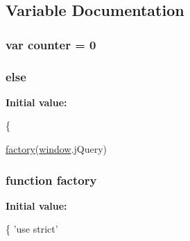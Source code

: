 \subsection{Variable Documentation}
\hypertarget{jquery_8iframe-transport_8js_ae2ecbfe6e878f64156d90e6f31875f2c}{
\subsubsection[{counter}]{\setlength{\rightskip}{0pt plus 5cm}var counter = 0}}\label{jquery_8iframe-transport_8js_ae2ecbfe6e878f64156d90e6f31875f2c}
\hypertarget{jquery_8iframe-transport_8js_a0544c3fe466e421738dae463968b70ba}{
\subsubsection[{else}]{\setlength{\rightskip}{0pt plus 5cm}else}}\label{jquery_8iframe-transport_8js_a0544c3fe466e421738dae463968b70ba}
{\bfseries Initial value\+:}
\begin{DoxyCode}
\{
        
        \hyperlink{jquery_8iframe-transport_8js_abf075bdbe59fd2c3336ed052c9c72b31}{factory}(\hyperlink{docs_2media_2js_2jquery_8js_ad55530ae1e5978df8e721017c1fc8466}{window}.jQuery)
\end{DoxyCode}
\hypertarget{jquery_8iframe-transport_8js_abf075bdbe59fd2c3336ed052c9c72b31}{
\subsubsection[{factory}]{\setlength{\rightskip}{0pt plus 5cm}function factory}}\label{jquery_8iframe-transport_8js_abf075bdbe59fd2c3336ed052c9c72b31}
{\bfseries Initial value\+:}
\begin{DoxyCode}
\{
    \textcolor{stringliteral}{'use strict'}
\end{DoxyCode}
